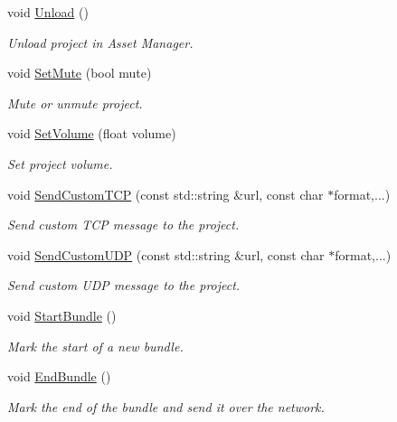 \begin{DoxyCompactItemize}
void \hyperlink{classam_1_1_asset_manager_client_ac738859d526f37cc1a708d5d4f8f2de3}{Unload} ()
\begin{DoxyCompactList}\small\item\em Unload project in Asset Manager. \end{DoxyCompactList}\item 
void \hyperlink{classam_1_1_asset_manager_client_aaf7ae48f7234fcc98f9c5e15dad4c46c}{SetMute} (bool mute)
\begin{DoxyCompactList}\small\item\em Mute or unmute project. \end{DoxyCompactList}\item 
void \hyperlink{classam_1_1_asset_manager_client_a0aacdcf0ab177994980ea5a28d368292}{SetVolume} (float volume)
\begin{DoxyCompactList}\small\item\em Set project volume. \end{DoxyCompactList}\item 
void \hyperlink{classam_1_1_asset_manager_client_ae926351a13831b539c185e2ec4f7a9d9}{SendCustomTCP} (const std::string \&url, const char $\ast$format,...)
\begin{DoxyCompactList}\small\item\em Send custom TCP message to the project. \end{DoxyCompactList}\item 
void \hyperlink{classam_1_1_asset_manager_client_a547f6a9f9acdf7318c47640099cff091}{SendCustomUDP} (const std::string \&url, const char $\ast$format,...)
\begin{DoxyCompactList}\small\item\em Send custom UDP message to the project. \end{DoxyCompactList}\item 
void \hyperlink{classam_1_1_asset_manager_client_aa3915a3098877eb926859b978309f872}{StartBundle} ()
\begin{DoxyCompactList}\small\item\em Mark the start of a new bundle. \end{DoxyCompactList}\item 
void \hyperlink{classam_1_1_asset_manager_client_a53e3932c674527bb7568c2de594db296}{EndBundle} ()
\begin{DoxyCompactList}\small\item\em Mark the end of the bundle and send it over the network. \end{DoxyCompactList}\end{DoxyCompactItemize}


